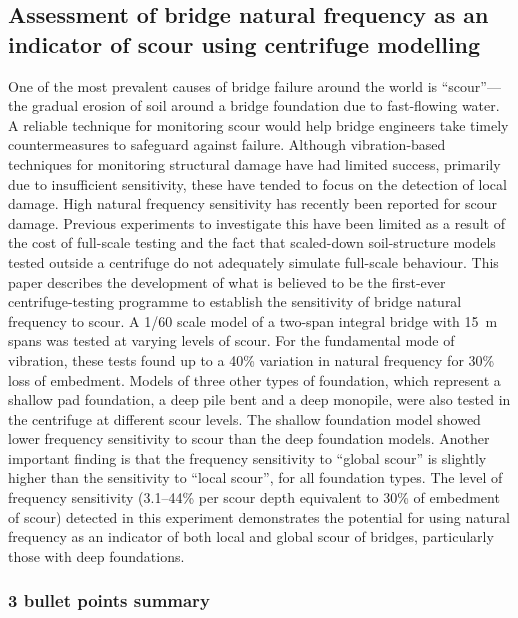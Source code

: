 \documentclass[
  letterpaper,
  DIV=11,
  numbers=noendperiod]{scrreprt}
\begin{document}
\hypertarget{assessment-of-bridge-natural-frequency-as-an-indicator-of-scour-using-centrifuge-modelling}{%
\subsection{Assessment of bridge natural frequency as an indicator of
scour using centrifuge
modelling}\label{assessment-of-bridge-natural-frequency-as-an-indicator-of-scour-using-centrifuge-modelling}}

One of the most prevalent causes of bridge failure around the world is
``scour''---the gradual erosion of soil around a bridge foundation due
to fast-flowing water. A reliable technique for monitoring scour would
help bridge engineers take timely countermeasures to safeguard against
failure. Although vibration-based techniques for monitoring structural
damage have had limited success, primarily due to insufficient
sensitivity, these have tended to focus on the detection of local
damage. High natural frequency sensitivity has recently been reported
for scour damage. Previous experiments to investigate this have been
limited as a result of the cost of full-scale testing and the fact that
scaled-down soil-structure models tested outside a centrifuge do not
adequately simulate full-scale behaviour. This paper describes the
development of what is believed to be the first-ever centrifuge-testing
programme to establish the sensitivity of bridge natural frequency to
scour. A 1/60 scale model of a two-span integral bridge with 15~m spans
was tested at varying levels of scour. For the fundamental mode of
vibration, these tests found up to a 40\% variation in natural frequency
for 30\% loss of embedment. Models of three other types of foundation,
which represent a shallow pad foundation, a deep pile bent and a deep
monopile, were also tested in the centrifuge at different scour levels.
The shallow foundation model showed lower frequency sensitivity to scour
than the deep foundation models. Another important finding is that the
frequency sensitivity to ``global scour'' is slightly higher than the
sensitivity to ``local scour'', for all foundation types. The level of
frequency sensitivity (3.1--44\% per scour depth equivalent to 30\% of
embedment of scour) detected in this experiment demonstrates the
potential for using natural frequency as an indicator of both local and
global scour of bridges, particularly those with deep foundations.

\hypertarget{bullet-points-summary-1}{%
\subsubsection{3 bullet points summary}\label{bullet-points-summary-1}}
\end{document}

